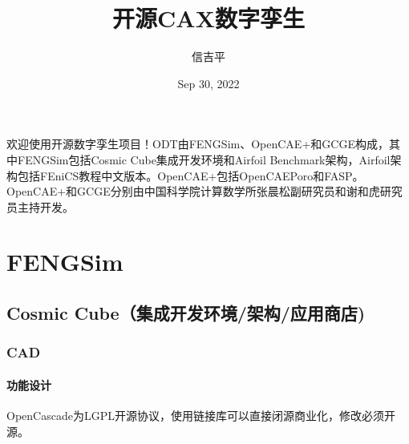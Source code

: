 \documentclass[letterpaper,10pt,english]{sphinxmanual}
\title{开源CAX数字孪生}
\date{Sep 30, 2022}
\author{信吉平}
\let\sphinxpxdimen\pdfpxdimen\else\newdimen\sphinxpxdimen
\begin{document}
\pagestyle{empty}
\sphinxmaketitle
\pagestyle{plain}
\sphinxtableofcontents
\pagestyle{normal}
\label{\detokenize{index::doc}}
\sphinxstepscope



\sphinxAtStartPar
欢迎使用开源数字孪生项目！ODT由FENGSim、OpenCAE+和GCGE构成，其中FENGSim包括Cosmic Cube集成开发环境和Airfoil Benchmark架构，Airfoil架构包括FEniCS教程中文版本。OpenCAE+包括OpenCAEPoro和FASP。OpenCAE+和GCGE分别由中国科学院计算数学所张晨松副研究员和谢和虎研究员主持开发。

\sphinxstepscope


\chapter{FENGSim}
\label{\detokenize{src/fengsim/main:fengsim}}\label{\detokenize{src/fengsim/main::doc}}
\sphinxstepscope


\section{Cosmic Cube（集成开发环境/架构/应用商店)}
\label{\detokenize{src/fengsim/cosmiccube:cosmic-cube}}\label{\detokenize{src/fengsim/cosmiccube::doc}}
\sphinxstepscope


\subsection{CAD}
\label{\detokenize{src/fengsim/cad:cad}}\label{\detokenize{src/fengsim/cad::doc}}
\sphinxstepscope


\subsubsection{功能设计}
\label{\detokenize{src/fengsim/cad_design:id1}}\label{\detokenize{src/fengsim/cad_design::doc}}
\sphinxAtStartPar
OpenCascade为LGPL开源协议，使用链接库可以直接闭源商业化，修改必须开源。

\noindent\sphinxincludegraphics[width=600\sphinxpxdimen]{{cad}.png}
\end{document}
